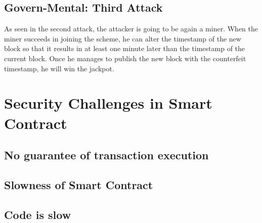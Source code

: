\subsection{Govern-Mental: Third Attack}
As seen in the second attack, the attacker is going to be again a miner. When the miner succeeds in joining the scheme, he can alter the timestamp of the new block so that it results in at least one minute later than the timestamp of the current block. Once he manages to publish the new block with the counterfeit timestamp, he will win the jackpot.
\section{Security Challenges in Smart Contract}
\subsection{No guarantee of transaction execution}
\subsection{Slowness of Smart Contract}
\subsection{Code is slow}

